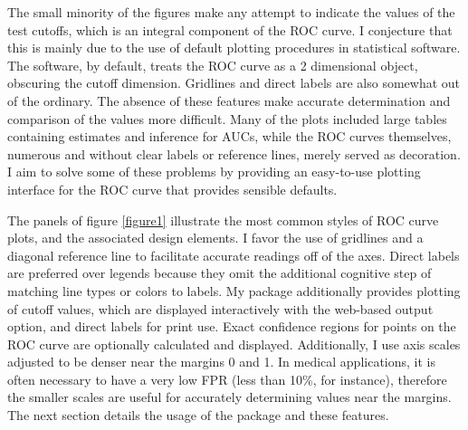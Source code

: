 \documentclass[article]{jss}
\begin{document}
The small minority of the figures make any attempt to indicate the
values of the test cutoffs, which is an integral component of the ROC
curve. I conjecture that this is mainly due to the use of default
plotting procedures in statistical software. The software, by default,
treats the ROC curve as a 2 dimensional object, obscuring the cutoff
dimension. Gridlines and direct labels are also somewhat out of the
ordinary. The absence of these features make accurate determination and
comparison of the values more difficult. Many of the plots included
large tables containing estimates and inference for AUCs, while the ROC
curves themselves, numerous and without clear labels or reference lines,
merely served as decoration. I aim to solve some of these problems by
providing an easy-to-use plotting interface for the ROC curve that
provides sensible defaults.

The panels of figure \ref{figure1} illustrate the most common styles of
ROC curve plots, and the associated design elements. I favor the use of
gridlines and a diagonal reference line to facilitate accurate readings
off of the axes. Direct labels are preferred over legends because they
omit the additional cognitive step of matching line types or colors to
labels. My  package additionally provides plotting of
cutoff values, which are displayed interactively with the web-based
output option, and direct labels for print use. Exact confidence regions
for points on the ROC curve are optionally calculated and displayed.
Additionally, I use axis scales adjusted to be denser near the margins 0
and 1. In medical applications, it is often necessary to have a very low
FPR (less than 10\%, for instance), therefore the smaller scales are
useful for accurately determining values near the margins. The next
section details the usage of the   package and
these features.
\end{document}
